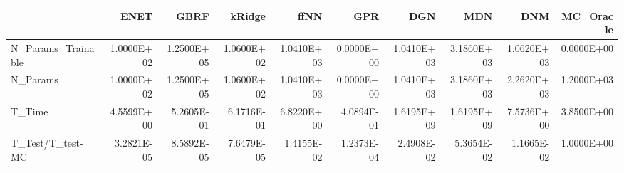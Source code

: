 \begin{tabular}{lrrrrrrrrr}
\toprule
{} &       ENET &       GBRF &     kRidge &       ffNN &        GPR &        DGN &        MDN &        DNM &  MC\_Oracle \\
\midrule
N\_Params\_Trainable & 1.0000E+02 & 1.2500E+05 & 1.0600E+02 & 1.0410E+03 & 0.0000E+00 & 1.0410E+03 & 3.1860E+03 & 1.0620E+03 & 0.0000E+00 \\
N\_Params           & 1.0000E+02 & 1.2500E+05 & 1.0600E+02 & 1.0410E+03 & 0.0000E+00 & 1.0410E+03 & 3.1860E+03 & 2.2620E+03 & 1.2000E+03 \\
T\_Time             & 4.5599E+00 & 5.2605E-01 & 6.1716E-01 & 6.8220E+00 & 4.0894E-01 & 1.6195E+09 & 1.6195E+09 & 7.5736E+00 & 3.8500E+00 \\
T\_Test/T\_test-MC   & 3.2821E-05 & 8.5892E-05 & 7.6479E-05 & 1.4155E-02 & 1.2373E-04 & 2.4908E-02 & 5.3654E-02 & 1.1665E-02 & 1.0000E+00 \\
\bottomrule
\end{tabular}
